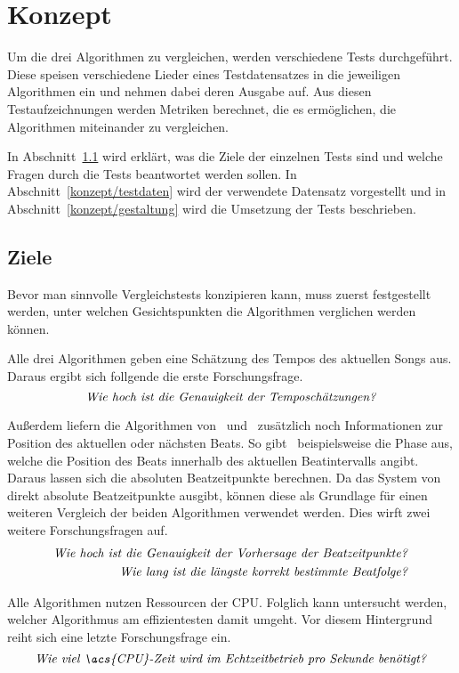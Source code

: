\chapter{Konzept}
\label{konzept}
\acresetall

Um die drei Algorithmen zu vergleichen,
	werden verschiedene Tests durchgeführt.
Diese speisen verschiedene Lieder eines Testdatensatzes in die jeweiligen Algorithmen ein
	und nehmen dabei deren Ausgabe auf.
Aus diesen Testaufzeichnungen werden Metriken berechnet,
	die es ermöglichen,
	die Algorithmen miteinander zu vergleichen.

In Abschnitt~\ref{konzept/ziele} wird erklärt,
	was die Ziele der einzelnen Tests sind
	und welche Fragen durch die Tests beantwortet werden sollen.
In Abschnitt~\ref{konzept/testdaten} wird der verwendete Datensatz vorgestellt
	und in Abschnitt~\ref{konzept/gestaltung} wird die Umsetzung der Tests beschrieben.


\section{Ziele} \label{konzept/ziele}
{
	Bevor man sinnvolle Vergleichstests konzipieren kann,
		muss zuerst festgestellt werden,
		unter welchen Gesichtspunkten die Algorithmen verglichen werden können.

	Alle drei Algorithmen geben eine Schätzung des Tempos des aktuellen Songs aus.
	Daraus ergibt sich follgende die erste Forschungsfrage.
	\begin{equation}
		\label{question:tempo}
		\text{\emph{Wie hoch ist die Genauigkeit der Temposchätzungen?}}
	\end{equation}

	Au{\ss}erdem liefern die Algorithmen von~\cite{2009_DaPlSt} und~\cite{2011_PlRoSt} zusätzlich noch Informationen zur Position des aktuellen oder nächsten Beats.
	So gibt~\cite{2011_PlRoSt} beispielsweise die Phase aus,
		welche die Position des Beats innerhalb des aktuellen Beatintervalls angibt.
	Daraus lassen sich die absoluten Beatzeitpunkte berechnen.
	Da das System von~\cite{2009_DaPlSt} direkt absolute Beatzeitpunkte ausgibt,
		können diese als Grundlage für einen weiteren Vergleich der beiden Algorithmen verwendet werden.
	Dies wirft zwei weitere Forschungsfragen auf.
	\begin{align}
		\label{question:beat}
		\text{\emph{Wie hoch ist die Genauigkeit der Vorhersage der Beatzeitpunkte?}} \\
		\label{question:streak}
		\text{\emph{Wie lang ist die längste korrekt bestimmte Beatfolge?}}
	\end{align}

	Alle Algorithmen nutzen Ressourcen der \ac{CPU}.
	Folglich kann untersucht werden,
		welcher Algorithmus am effizientesten damit umgeht.
	Vor diesem Hintergrund reiht sich eine letzte Forschungsfrage ein.
	\begin{equation}
		\label{question:cpu_time}
		\text{\emph{Wie viel \acs{CPU}-Zeit wird im Echtzeitbetrieb pro Sekunde benötigt?}}
	\end{equation}
}

